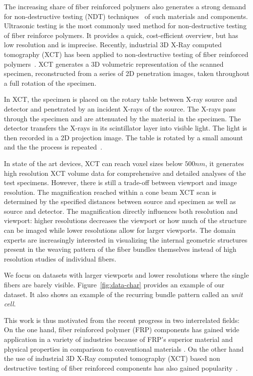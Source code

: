 The increasing share of fiber reinforced polymers also generates a strong demand for non-destructive testing (NDT) techniques~\cite{Red2012} of such materials and components. Ultrasonic testing is the most commonly used method for non-destructive testing of fiber reinforce polymers.
It provides a quick, cost-efficient overview, but has low resolution and is imprecise. Recently, industrial 3D X-Ray computed tomography (XCT) has been applied to non-destructive testing of fiber reinforced polymers~\cite{Kastner2012}. XCT generates a 3D volumetric representation of the scanned specimen, reconstructed from a series of 2D penetration images, taken throughout a full rotation of the specimen. 

In XCT, the specimen is  placed on the rotary table between X-ray source and detector and penetrated by an incident X-rays of the source.
The X-rays pass through the specimen and are attenuated by the material in the specimen.
The detector transfers the X-rays in its scintillator layer into visible light. The light is then recorded in a 2D projection image. 
The table is rotated by a small amount and the the process is repeated~\cite{heinzl-2008-thesis}. 


In state of the art devices, XCT can reach voxel sizes below $500 nm$,
it generates high resolution XCT volume data for comprehensive and detailed analyses of the test specimens. However, there is still a trade-off between viewport and image resolution. The magnification reached within a cone beam XCT scan is determined by the specified distances
between source and specimen as well as source and detector. The magnification directly influences both resolution and viewport: higher resolutions decreases the viewport or how much of the structure can be imaged while lower resolutions allow for larger viewports.
The domain experts are increasingly interested in visualizing the internal geometric structures present in the  weaving pattern of the fiber bundles themselves instead of high resolution studies of individual fibers.
 

We focus on datasets with larger viewports and lower resolutions where the single fibers are barely visible. 
Figure~\ref{fig:data-char} provides an example of our dataset. It also shows an example of the recurring bundle pattern called an \textit{unit cell}.

 This work is thus motivated from the recent progress in two interrelated fields: On the one hand, fiber reinforced polymer (FRP) components has gained wide application in a variety of industries  because of FRP's superior material and physical properties in comparison to conventional materials \cite{Karpat2012}. On the other hand the use of industrial 3D X-Ray computed tomography (XCT) based non destructive testing of fiber reinforced components has also gained popularity~\cite{Schilling2005}. 

